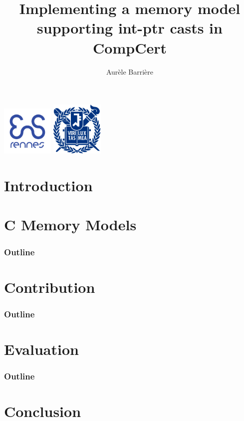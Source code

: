 \documentclass[page number]{beamer}
\begin{document}
\title[Int-Ptr casts in CompCert]{Implementing a memory model supporting int-ptr casts in CompCert}


\author{Aur\`ele Barri\`ere}

\def\todo#1{{\color{red}TODO:\quad#1}}
\def\addref#1{{\color{red}$[$#1$]$}}
\def\undef{\textit{undef}}
\def\states#1{\mathit{States_{#1}}}
\def\step#1{\mathit{Step_{#1}}}
\def\atstep#1{\mathit{AtomicStep_{#1}}}
\def\traces{\mathit{Traces}}
\def\comment#1{{\color{blue}\textit{#1}}}
\def\outline{
  \begin{frame}
    \frametitle{Outline}
    \tableofcontents[currentsection]
  \end{frame}
}

\begin{frame}[plain]
  \titlepage%
  \vfill
  \begin{center}
    \includegraphics[width=2.5cm]{img/enslogo.png}
    \hfill
    \includegraphics[width=2.5cm]{img/snulogo.png}
  \end{center}
\end{frame}

\section{Introduction}


\section{C Memory Models}
\outline


\section{Contribution}
\outline


\section{Evaluation}
\outline


\section{Conclusion}

\end{document}
